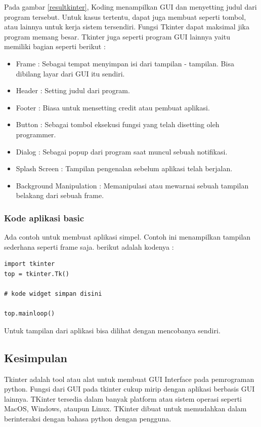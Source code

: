 Pada gambar \ref{resultkinter}, Koding menampilkan GUI dan menyetting judul dari program tersebut. Untuk kasus tertentu, dapat juga membuat seperti tombol, atau lainnya untuk kerja sistem tersendiri. Fungsi Tkinter dapat maksimal jika program memang besar. Tkinter juga seperti program GUI lainnya yaitu memiliki bagian seperti berikut : 
\begin{itemize}
	\item Frame : Sebagai tempat menyimpan isi dari tampilan - tampilan. Bisa dibilang layar dari GUI itu sendiri.	
	\item Header : Setting judul dari program.
	\item Footer : Biasa untuk mensetting credit atau pembuat aplikasi.
	\item Button : Sebagai tombol eksekusi fungsi yang telah disetting oleh programmer.
	\item Dialog : Sebagai popup dari program saat muncul sebuah notifikasi.
	\item Splash Screen : Tampilan pengenalan sebelum aplikasi telah berjalan.
	\item Background Manipulation : Memanipulasi atau mewarnai sebuah tampilan belakang dari sebuah frame.
\end{itemize}
\subsubsection{Kode aplikasi basic}
Ada contoh untuk membuat aplikasi simpel. Contoh ini menampilkan tampilan sederhana seperti frame saja. berikut adalah kodenya :
\begin{verbatim}
import tkinter
top = tkinter.Tk()
 
# kode widget simpan disini
 
top.mainloop()
\end{verbatim}
Untuk tampilan dari aplikasi bisa dilihat dengan mencobanya sendiri.
\subsection{Kesimpulan}
Tkinter adalah tool atau alat untuk membuat GUI Interface pada pemrograman python. Fungsi dari GUI pada tkinter cukup mirip dengan aplikasi berbasis GUI lainnya. TKinter tersedia dalam banyak platform atau sistem operasi seperti MacOS, Windows, ataupun Linux. TKinter dibuat untuk memudahkan dalam berinteraksi dengan bahasa python dengan pengguna.
